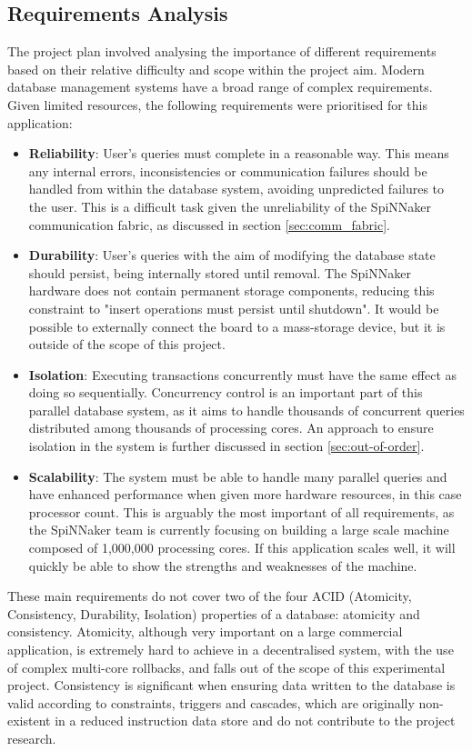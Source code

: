 \subsection{Requirements Analysis}
The project plan involved analysing the importance of different requirements based on their relative difficulty and scope within the project aim. Modern database management systems have a broad range of complex requirements. Given limited resources, the following requirements were prioritised for this application:

\begin{itemize}
	\item \textbf{Reliability}: User's queries must complete in a reasonable way. This means any internal errors, inconsistencies or communication failures should be handled from within the database system, avoiding unpredicted failures to the user. This is a difficult task given the unreliability of the SpiNNaker communication fabric, as discussed in section \ref{sec:comm_fabric}.
	\item \textbf{Durability}: User's queries with the aim of modifying the database state should persist, being internally stored until removal. The SpiNNaker hardware does not contain permanent storage components, reducing this constraint to "insert operations must persist until shutdown". It would be possible to externally connect the board to a mass-storage device, but it is outside of the scope of this project.
	\item \textbf{Isolation}: Executing transactions concurrently must have the same effect as doing so sequentially. Concurrency control is an important part of this parallel database system, as it aims to handle thousands of concurrent queries distributed among thousands of processing cores. An approach to ensure isolation in the system is further discussed in section \ref{sec:out-of-order}.
	\item \textbf{Scalability}: The system must be able to handle many parallel queries and have enhanced performance when given more hardware resources, in this case processor count.	This is arguably the most important of all requirements, as the SpiNNaker team is currently focusing on building a large scale machine composed of 1,000,000 processing cores. If this application scales well, it will quickly be able to show the strengths and weaknesses of the machine.
\end{itemize}

These main requirements do not cover two of the four ACID (Atomicity, Consistency, Durability, Isolation) properties of a database: atomicity and consistency. Atomicity, although very important on a large commercial application, is extremely hard to achieve in a decentralised system, with the use of complex multi-core rollbacks, and falls out of the scope of this experimental project. Consistency is significant when ensuring data written to the database is valid according to constraints, triggers and cascades, which are originally non-existent in a reduced instruction data store and do not contribute to the project research.

